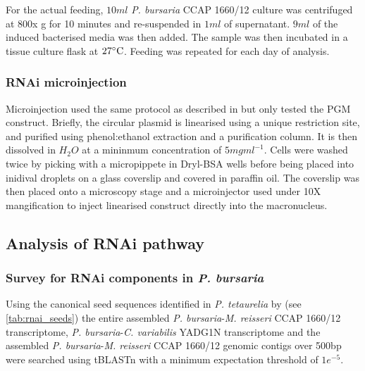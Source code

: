 For the actual feeding, \(10ml\) \textit{P. bursaria} CCAP 1660/12 culture
was centrifuged at 800x g for 10 minutes and re-suspended in \(1ml\) of supernatant.
\(9ml\) of the induced bacterised media was then added.  The sample was
then incubated in a tissue culture flask at \(27\celsius\).
Feeding was repeated for each day of analysis. 

\subsubsection{RNAi microinjection}

Microinjection used the same protocol as described in \citep{Beisson2010b} 
but only tested the PGM construct.
Briefly, the circular plasmid is linearised using a unique restriction site,
and purified using phenol:ethanol extraction and a purification column.
It is then dissolved in \(H_{2}O\) at a mininmum concentration of 
\(5mg ml^{-1}\).
Cells were washed twice by picking with a micropippete in Dryl-BSA wells before
being placed into inidival droplets on a glass coverslip and covered in paraffin oil.
The coverslip was then placed onto a microscopy stage and a microinjector 
used under 10X mangification to inject linearised construct directly into the
macronucleus.

\subsection{Analysis of RNAi pathway}

\subsubsection{Survey for RNAi components in \textit{P. bursaria}}

Using the canonical seed sequences identified in \textit{P. tetaurelia}
by \citep{Marker2014} (see \cref{tab:rnai_seeds}) the entire assembled 
\textit{P. bursaria}-\textit{M. reisseri} CCAP 1660/12 transcriptome,
\textit{P. bursaria}-\textit{C. variabilis} YADG1N transcriptome
and the assembled \textit{P. bursaria}-\textit{M. reisseri} CCAP 1660/12
genomic contigs over 500bp were searched using tBLASTn
with a minimum expectation threshold of \(1e^{-5}\).

